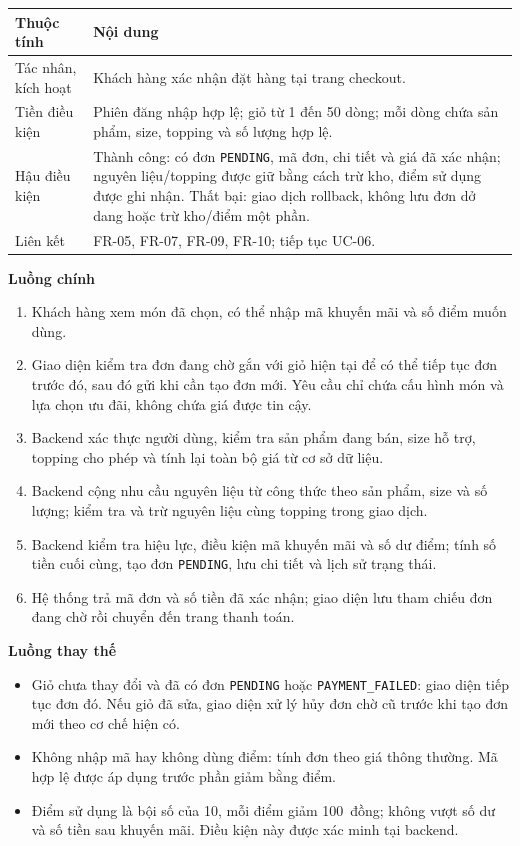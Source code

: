 \begin{longtable}{|p{3.1cm}|p{11.5cm}|}
\hline \textbf{Thuộc tính} & \textbf{Nội dung} \\ \hline
Tác nhân, kích hoạt & Khách hàng xác nhận đặt hàng tại trang checkout. \\ \hline
Tiền điều kiện & Phiên đăng nhập hợp lệ; giỏ từ 1 đến 50 dòng; mỗi dòng
chứa sản phẩm, size, topping và số lượng hợp lệ. \\ \hline
Hậu điều kiện & Thành công: có đơn \texttt{PENDING}, mã đơn, chi tiết và
giá đã xác nhận; nguyên liệu/topping được giữ bằng cách trừ kho, điểm sử
dụng được ghi nhận. Thất bại: giao dịch rollback, không lưu đơn dở dang
hoặc trừ kho/điểm một phần. \\ \hline
Liên kết & FR-05, FR-07, FR-09, FR-10; tiếp tục UC-06. \\ \hline
\end{longtable}

\textbf{Luồng chính}
\begin{enumerate}[nosep]
  \item Khách hàng xem món đã chọn, có thể nhập mã khuyến mãi và số điểm muốn dùng.
  \item Giao diện kiểm tra đơn đang chờ gắn với giỏ hiện tại để có thể tiếp
  tục đơn trước đó, sau đó gửi  khi cần tạo đơn mới.
  Yêu cầu chỉ chứa cấu hình món và lựa chọn ưu đãi, không chứa giá được tin cậy.
  \item Backend xác thực người dùng, kiểm tra sản phẩm đang bán, size hỗ
  trợ, topping cho phép và tính lại toàn bộ giá từ cơ sở dữ liệu.
  \item Backend cộng nhu cầu nguyên liệu từ công thức theo sản phẩm, size
  và số lượng; kiểm tra và trừ nguyên liệu cùng topping trong giao dịch.
  \item Backend kiểm tra hiệu lực, điều kiện mã khuyến mãi và số dư điểm;
  tính số tiền cuối cùng, tạo đơn \texttt{PENDING}, lưu chi tiết và lịch sử trạng thái.
  \item Hệ thống trả mã đơn và số tiền đã xác nhận; giao diện lưu tham
  chiếu đơn đang chờ rồi chuyển đến trang thanh toán.
\end{enumerate}

\textbf{Luồng thay thế}
\begin{itemize}[nosep]
  \item Giỏ chưa thay đổi và đã có đơn \texttt{PENDING} hoặc
  \texttt{PAYMENT\_FAILED}: giao diện tiếp tục đơn đó. Nếu giỏ đã sửa, giao
  diện xử lý hủy đơn chờ cũ trước khi tạo đơn mới theo cơ chế hiện có.
  \item Không nhập mã hay không dùng điểm: tính đơn theo giá thông thường.
  Mã hợp lệ được áp dụng trước phần giảm bằng điểm.
  \item Điểm sử dụng là bội số của 10, mỗi điểm giảm 100~đồng; không vượt
  số dư và số tiền sau khuyến mãi. Điều kiện này được xác minh tại backend.
\end{itemize}


